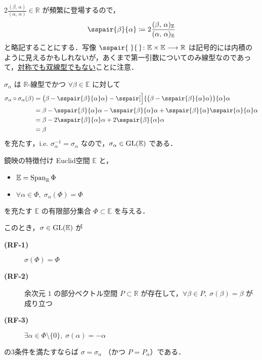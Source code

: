 \documentclass[rep_main]{subfiles}
\begin{document}
\begin{marker}
    $2 \frac{(\beta,\, \alpha)}{(\alpha,\, \alpha)} \in \mathbb{R}$ が頻繁に登場するので，
    \begin{align}
		\sspair{\beta}{\alpha} \coloneqq 2\frac{(\beta,\, \alpha)_{\mathbb{E}}}{(\alpha,\, \alpha)_{\mathbb{E}}}
	\end{align}
	と略記することにする．写像 $\sspair{\;}{\,} \colon \mathbb{E} \times \mathbb{E} \lto \mathbb{R}$ は記号的には内積のように見えるかもしれないが，あくまで第一引数についてのみ線型なのであって，\underline{対称でも双線型でもない}ことに注意．
\end{marker}

$\sigma_\alpha$ は $\mathbb{R}$-線型でかつ $\forall \beta \in \mathbb{E}$ に対して
\begin{align}
	\sigma_\alpha \circ \sigma_\alpha (\beta) 
	&= \bigl(\beta - \sspair{\beta}{\alpha} \alpha\bigr) - \sspair[\Big]{\bigl(\beta - \sspair{\beta}{\alpha} \alpha\bigr)}{\alpha}\alpha \\
	&= \beta - \sspair{\beta}{\alpha} \alpha - \sspair{\beta}{\alpha}\alpha + \sspair{\beta}{\alpha}\sspair{\alpha}{\alpha} \alpha \\
	&= \beta - 2\sspair{\beta}{\alpha}\alpha + 2\sspair{\beta}{\alpha}\alpha \\
	&= \beta
\end{align}
を充たす，i.e. $\sigma_\alpha^{-1} = \sigma_\alpha$ なので，$\sigma_\alpha \in \mathrm{GL}(\mathbb{E})$ である．

\begin{mylem}[label=lem:refrect]{鏡映の特徴付け}
	Euclid空間 $\mathbb{E}$ と，
	\begin{itemize}
		\item $\mathbb{E} = \operatorname{Span}_{\mathbb{R}}\Phi$ 
		\item $\forall \alpha \in \Phi,\; \sigma_\alpha(\Phi) = \Phi$ 
	\end{itemize}
	を充たす $\mathbb{E}$ の有限部分集合 $\Phi \subset \mathbb{E}$ を与える．

	このとき，$\sigma \in \mathrm{GL}(\mathbb{E})$ が
	\begin{description}
		\item[\textbf{(RF-1)}]  $\sigma(\Phi) = \Phi$
		\item[\textbf{(RF-2)}]  余次元 $1$ の部分ベクトル空間 $P \subset \mathbb{R}$ が存在して，$\forall \beta \in P,\; \sigma(\beta) = \beta$ が成り立つ
		\item[\textbf{(RF-3)}]  $\exists \alpha \in \Phi \setminus \{0\},\; \sigma(\alpha) = -\alpha$
	\end{description}
	の3条件を満たすならば $\sigma = \sigma_\alpha$ （かつ $P = P_\alpha$）である．
\end{mylem}
\end{document}
